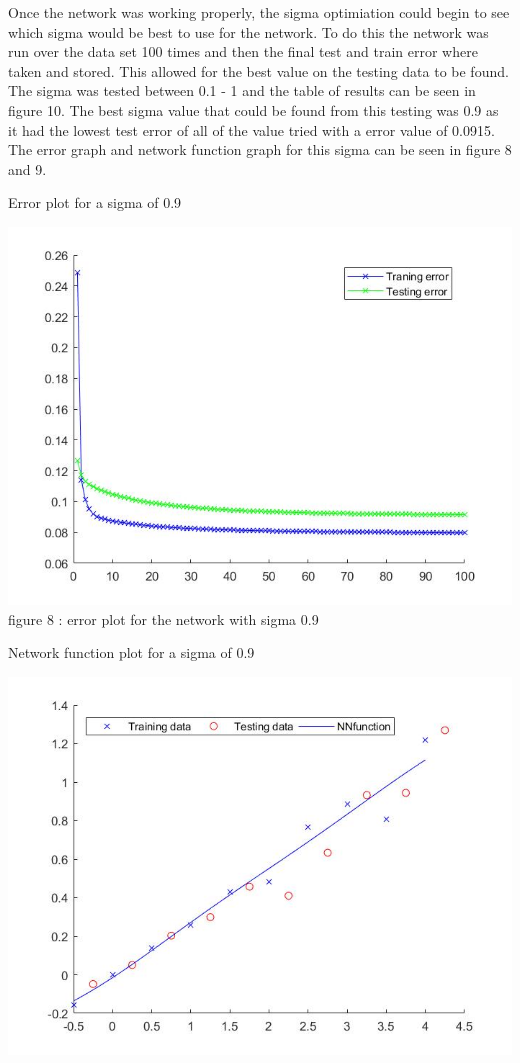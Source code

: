 \documentclass{IEEEtran}
\begin{document}
\begin{flushleft}
  Once the network was working properly, the sigma optimiation could begin to see which sigma would be best to use for the
  network. To do this the network was run over the data set 100 times and then the final test and train error where taken and
  stored. This allowed for the best value on the testing data to be found. The sigma was tested between 0.1 - 1 and the table
  of results can be seen in figure 10. The best sigma value that could be found from this testing was 0.9 as it had the lowest
  test error of all of the value tried with a error value of 0.0915. The error graph and network function graph for this sigma
  can be seen in figure 8 and 9.
  \\
\vspace{1.5mm}
\begin{center}
  Error plot for a sigma of 0.9
\end{center}
\vspace{1.5mm}
\includegraphics[scale = 0.35]{Errorplottask1.jpg}
\vspace{1.5mm}
{\footnotesize figure 8 : error plot for the network with sigma 0.9 }
\\
\vspace{1.5mm}
\begin{center}
  Network function plot for a sigma of 0.9
\end{center}
\includegraphics[scale = 0.35]{NNfunctiontask1.jpg}

\end{flushleft}
\end{document}
